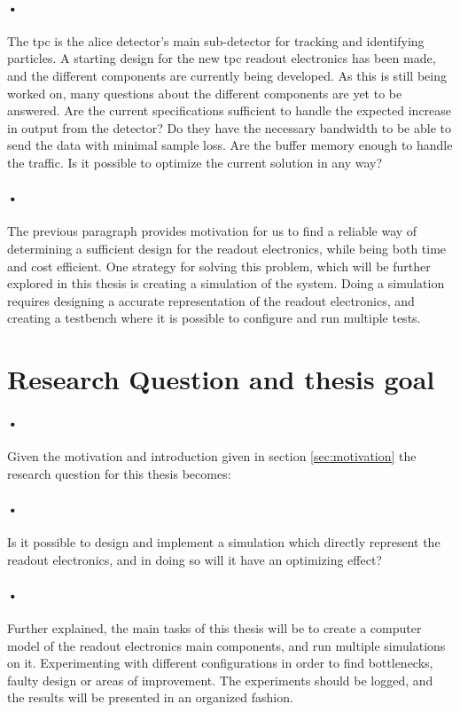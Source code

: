 \documentclass[a4paper, 12pt]{report}
\begin{document}
\paragraph{•}
The \gls{tpc} is the \gls{alice} detector's main sub-detector for tracking and identifying particles.
A starting design for the new \gls{tpc} readout electronics has been made, and the different components are currently being developed.
As this is still being worked on, many questions about the different components are yet to be answered.
Are the current specifications sufficient to handle the expected increase in output from the detector?
Do they have the necessary bandwidth to be able to send the data with minimal sample loss.
Are the buffer memory enough to handle the traffic.
Is it possible to optimize the current solution in any way?

\paragraph{•}
The previous paragraph provides motivation for us to find a reliable way of determining a sufficient design for the readout electronics, while being both time and cost efficient.
One strategy for solving this problem, which will be further explored in this thesis is creating a simulation of the system.
Doing a simulation requires designing a accurate representation of the readout electronics, and creating a testbench where it is possible to configure and run multiple tests.


\section{Research Question and thesis goal}

\paragraph{•}
Given the motivation and introduction given in section \ref{sec:motivation} the research question for this thesis becomes:

\paragraph{•}
Is it possible to design and implement a simulation which directly represent the readout electronics, and in doing so will it have an optimizing effect?

\paragraph{•}
Further explained, the main tasks of this thesis will be to create a computer model of the readout electronics main components, and run multiple simulations on it.
Experimenting with different configurations in order to find bottlenecks, faulty design or areas of improvement.
The experiments should be logged, and the results will be presented in an organized fashion.
\end{document}
